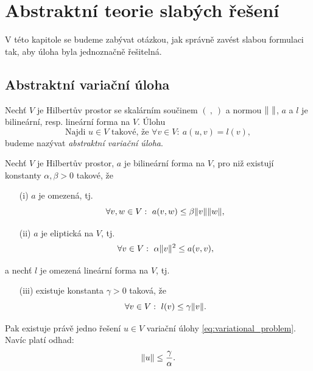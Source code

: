 





\section{Abstraktní teorie slabých řešení}

V této kapitole se budeme zabývat otázkou, jak správně zavést slabou formulaci tak, aby úloha byla jednoznačně řešitelná.

\subsection{Abstraktní variační úloha}

Nechť $V$ je Hilbertův prostor se skalárním součinem $(\ ,\ )$ a normou $\|\ \|$, $a$ a $l$ je bilineární, resp. lineární forma na $V$.
Úlohu
\begin{equation}
\label{eq:variational_problem}
\text{Najdi }u\in V \text{ takové, že }\forall v\in V:~a(u,v)=l(v),
\end{equation}
budeme nazývat \emph{abstraktní variační úloha}.


\begin{veta}\label{th:lax-milgram}
Nechť $V$ je Hilbertův prostor, $a$ je bilineární forma na $V$, pro niž existují konstanty $\alpha,\beta>0$ takové, že
\begin{itemize}
\item[(i)] $a$ je omezená, tj.
\[ \forall v,w\in V:~a(v,w)\le \beta\|v\|\|w\|, \]
\item[(ii)] $a$ je eliptická na $V$, tj.
\[ \forall v\in V:~\alpha\|v\|^2\le a(v,v), \]
\end{itemize}
a nechť $l$ je omezená lineární forma na $V$, tj.
\begin{itemize}
\item[(iii)] existuje konstanta $\gamma>0$ taková, že 
\[ \forall v\in V:~l(v)\le \gamma\|v\|. \]
\end{itemize}
Pak existuje právě jedno řešení $u\in V$ variační úlohy \eqref{eq:variational_problem}.
Navíc platí odhad:
\[ \|u\| \le \frac\gamma\alpha. \]
\end{veta}


